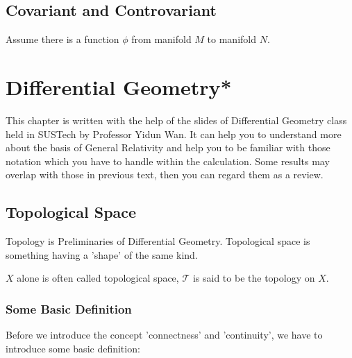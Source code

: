 \documentclass[openany,10pt]{book}
\theoremstyle{definition}
\theoremstyle{definition}
\theoremstyle{remark}
\begin{document}
\section{Covariant and Controvariant}
Assume there is a function $\phi$ from manifold $M$ to manifold $N$.


\chapter{Differential Geometry*}
This chapter is written with the help of the slides of Differential Geometry class held in SUSTech by Professor Yidun Wan. It can help you to understand more about the basis of General Relativity and help you to be familiar with those notation which you have to handle within the calculation. Some results may overlap with those in previous text, then you can regard them as a review.

\section{Topological Space}
Topology is Preliminaries of Differential Geometry. Topological space is something having a 'shape' of the same kind.

$X$ alone is often called topological space, $\mathcal{T}$ is said to be the topology on $X$.\\

\subsection{Some Basic Definition}
Before we introduce the concept 'connectness' and 'continuity', we have to introduce some basic definition:
\end{document}
